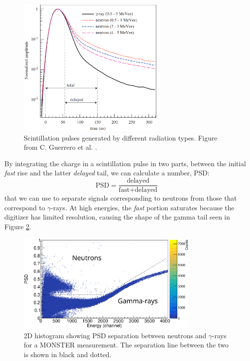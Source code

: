 \documentclass[a4paper,12pt]{report}
\begin{document}
\begin{figure}[H]
	\centering
	\includegraphics[width=0.65\textwidth]{psd_explanation.png}
	\caption{Scintillation pulses generated by different radiation types.
	Figure from C. Guerrero et al. \cite{guerrero2008}.}
	\label{psd_explanation}
\end{figure}

By integrating the charge in a scintillation pulse in two parts, between the initial \textit{fast} rise and the latter \textit{delayed} tail, we can calculate a number, PSD:
\begin{equation}
	\text{PSD} = \frac{\text{delayed}}{\text{fast}+\text{delayed}}
\end{equation}
that we can use to separate signals corresponding to neutrons from those that correspond to $\gamma$-rays.
At high energies, the \textit{fast} portion saturates because the digitizer has limited resolution, causing the shape of the gamma tail seen in Figure \ref{example_psd}.

\begin{figure}[H]
	\centering
	\includegraphics[width=0.80\textwidth]{example_psd.eps}
	\caption{2D histogram showing PSD separation between neutrons and $\gamma$-rays for a MONSTER measurement.
	The separation line between the two is shown in black and dotted.}
	\label{example_psd}
\end{figure}
\end{document}
